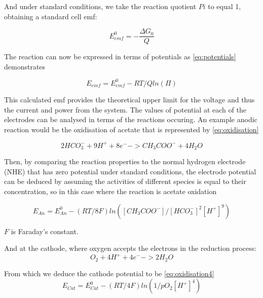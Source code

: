 \documentclass[12pt]{article}
\begin{document}
And under standard conditions, we take the reaction quotient $Pi$ to equal 1, obtaining a standard cell emf:

\begin{equation}
E^{0}_{emf} = - \frac{\Delta G_{0} }{ Q}
\end{equation}

The reaction can now be expressed in terms of potentials as \cref{eq:potentials} demonstrates

\begin{equation}
E_{emf} = E^{0}_{emf} - RT/Q ln (\Pi)
\label{eq:potentials}
\end{equation}

This calculated emf provides the theoretical upper limit for the voltage and thus the current and power from the system. The values of potential at each of the electrodes can be analysed in terms of the reactions occuring. An example anodic reaction would be the oxidisation of acetate that is represented by \cref{eq:oxidisation}

\begin{equation}
2HCO_{3}^{-} + 9H^{+} + 8e^{-} -> CH_{3}COO^{-} + 4H_{2}O
\label{eq:oxidisation}
\end{equation}

Then, by comparing the reaction properties to the normal hydrogen electrode (NHE) that has zero potential under standard conditions, the electrode potential can be deduced by assuming the activities of different species is equal to their concentration, so in this case where the reaction is acetate oxidation

\begin{equation}
E_{An} = E_{An}^{0}  - (RT / 8F) ln ([CH_{3}COO^{-}]/[HCO_{3}^{-}]^{2} [H^{+}]^{9{}})
\label{eq:oxidisation2}
\end{equation}

$F$ is Faraday's constant.

And at the cathode, where oxygen accepts the electrons in the reduction process:
\begin{equation}
O_{2} + 4H^{+} + 4e^{-} -> 2 H_{2} O
\label{eq:oxidisation3}
\end{equation}

From which we deduce the cathode potential to be \cref{eq:oxidisation4}
\begin{equation}
E_{Cat} = E_{Cat} ^ {0} - (RT/4F) ln(1/ p O_{2} [H^{+}]^{4})
\label{eq:oxidisation4}
\end{equation}
\end{document}
